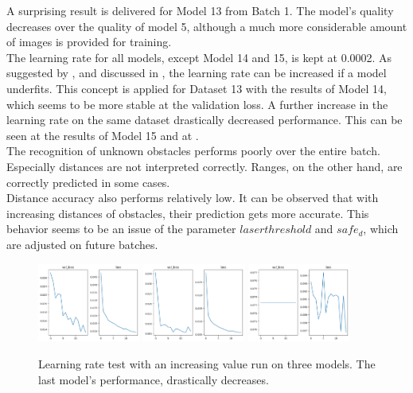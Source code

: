 A surprising result is delivered for Model 13 from Batch 1. The model's quality decreases over the quality of model 5, although a much more considerable amount of images is provided for training.\\

The learning rate for all models, except Model 14 and 15, is kept at 0.0002. As suggested by \cite{DBLP:journals/corr/abs-1803-09820}, and discussed in , the learning rate can be increased if a model underfits. This concept is applied for Dataset 13 with the results of Model 14, which seems to be more stable at the validation loss. A further increase in the learning rate on the same dataset drastically decreased performance. This can be seen at the results of Model 15 and at .\\

The recognition of unknown obstacles performs poorly over the entire batch. Especially distances are not interpreted correctly. Ranges, on the other hand, are correctly predicted in some cases.\\

Distance accuracy also performs relatively low. It can be observed that with increasing distances of obstacles, their prediction gets more accurate. This behavior seems to be an issue of the parameter $laserthreshold$ and $safe_{d}$, which are adjusted on future batches.

\vspace{0.2 cm}
\begin{figure}[h]%
\centering
\includegraphics[width=0.30\textwidth]{3_models/models_13/graph_13.png}
\hspace{0.2 cm}
\includegraphics[width=0.30\textwidth]{3_models/models_14/graph_14.png}
\hspace{0.2 cm}
\includegraphics[width=0.30\textwidth]{3_models/models_15/graph_15.png}
\caption[]{Learning rate test with an increasing value run on three models. The last model's performance, drastically decreases.}
\label{learning_rate_test}
\end{figure}

